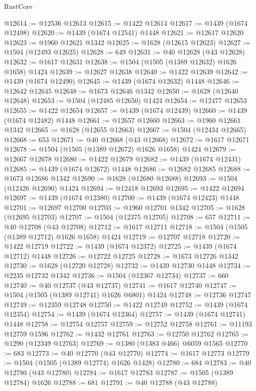 \begin{lexlean}{RustCore}
\begin{coremodule}
@12614 := @12536 @12613
@12615 := @1422 @12614
@12617 := @1439 (@1674 @12498)
@12620 := @1439 (@1674 @12541) @1448
@12621 := @12617 @12620
@12623 := @1960 @12621 @1342
@12625 := @1628 (@12615 @12623)
@12627 := @1504 (@12493 @12625)
@12628 := 649
@12631 := @40 @12628 (@43 @12628)
@12632 := @1617 @12631
@12638 := @1504 (@1505 (@1389 @12632) @1626 @1658) @1424
@12639 := @12627 @12638
@12640 := @1422 @12639
@12642 := @1439 (@1674 @12490)
@12645 := @1439 (@1674 @12632) @1448
@12646 := @12642 @12645
@12648 := @1673 @12646 @1342
@12650 := @1628 (@12640 @12648)
@12653 := @1504 (@12485 @12650) @1424
@12654 := @12477 @12653
@12655 := @1422 @12654
@12657 := @1439 (@1674 @12439)
@12660 := @1439 (@1674 @12482) @1448
@12661 := @12657 @12660
@12663 := @1960 @12661 @1342
@12665 := @1628 (@12655 @12663)
@12667 := @1504 (@12434 @12665)
@12668 := 653
@12671 := @40 @12668 (@43 @12668)
@12672 := @1617 @12671
@12678 := @1504 (@1505 (@1389 @12672) @1626 @1658) @1424
@12679 := @12667 @12678
@12680 := @1422 @12679
@12682 := @1439 (@1674 @12431)
@12685 := @1439 (@1674 @12672) @1448
@12686 := @12682 @12685
@12688 := @1673 @12686 @1342
@12690 := @1628 (@12680 @12688)
@12693 := @1504 (@12426 @12690) @1424
@12694 := @12418 @12693
@12695 := @1422 @12694
@12697 := @1439 (@1674 @12380)
@12700 := @1439 (@1674 @12423) @1448
@12701 := @12697 @12700
@12703 := @1960 @12701 @1342
@12705 := @1628 (@12695 @12703)
@12707 := @1504 (@12375 @12705)
@12708 := 657
@12711 := @40 @12708 (@43 @12708)
@12712 := @1617 @12711
@12718 := @1504 (@1505 (@1389 @12712) @1626 @1658) @1424
@12719 := @12707 @12718
@12720 := @1422 @12719
@12722 := @1439 (@1674 @12372)
@12725 := @1439 (@1674 @12712) @1448
@12726 := @12722 @12725
@12728 := @1673 @12726 @1342
@12730 := @1628 (@12720 @12728)
@12732 := @1439 @12730 @1448
@12734 := @2235 @12732 @1342
@12736 := @1504 (@12367 @12734)
@12737 := 660
@12740 := @40 @12737 (@43 @12737)
@12741 := @1617 @12740
@12747 := @1504 (@1505 (@1389 @12741) @1626 @6801) @1424
@12748 := @12736 @12747
@12749 := @12359 @12748
@12750 := @1422 @12749
@12752 := @1439 (@1674 @12354)
@12754 := @1439 (@1674 @12364)
@12757 := @1439 (@1674 @12741) @1448
@12758 := @12754 @12757
@12759 := @12752 @12758
@12761 := @11193 @12759 @1596
@12762 := @1432 @12761
@12763 := @12750 @12762
@12765 := @1290 (@12349 @12763)
@12769 := @1380 (@1383 @466) @6059 @1565
@12770 := 683
@12773 := @40 @12770 (@43 @12770)
@12774 := @1617 @12773
@12779 := @1504 (@1505 (@1389 @12774) @1626 @1428)
@12780 := 684
@12783 := @40 @12780 (@43 @12780)
@12784 := @1617 @12783
@12787 := @1505 (@1389 @12784) @1626
@12788 := 681
@12791 := @40 @12788 (@43 @12788)

\end{coremodule}
\end{lexlean}
